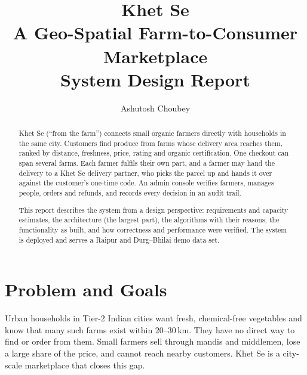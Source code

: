 \documentclass[11pt,a4paper]{article}
\title{\textbf{Khet Se}\\[4pt]\large A Geo-Spatial Farm-to-Consumer Marketplace\\[2pt]\normalsize System Design Report}
\author{Ashutosh Choubey}
\date{}
\begin{document}
\maketitle

\begin{abstract}
\noindent Khet Se (``from the farm'') connects small organic farmers directly with households in the same city. Customers find produce from farms whose delivery area reaches them, ranked by distance, freshness, price, rating and organic certification. One checkout can span several farms. Each farmer fulfils their own part, and a farmer may hand the delivery to a Khet Se delivery partner, who picks the parcel up and hands it over against the customer's one-time code. An admin console verifies farmers, manages people, orders and refunds, and records every decision in an audit trail.

This report describes the system from a design perspective: requirements and capacity estimates, the architecture (the largest part), the algorithms with their reasons, the functionality as built, and how correctness and performance were verified. The system is deployed and serves a Raipur and Durg--Bhilai demo data set.
\end{abstract}

\tableofcontents
\newpage

\section{Problem and Goals}

Urban households in Tier-2 Indian cities want fresh, chemical-free vegetables and know that many such farms exist within 20--30\,km. They have no direct way to find or order from them. Small farmers sell through mandis and middlemen, lose a large share of the price, and cannot reach nearby customers. Khet Se is a city-scale marketplace that closes this gap.
\end{document}
